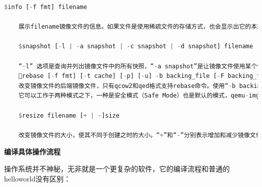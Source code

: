 \begin{lstlisting}[language={Rust}, label={code:forktest},
	caption={forktest.rs}]
	$info [-f fmt] filename
	
	展示filename镜像文件的信息。如果文件是使用稀疏文件的存储方式，也会显示出它的本来分配的大小以及实际已占用的磁盘空间大小。如果文件中存放有客户机快照，快照的信息也会被显示出来。
	
	$snapshot [-l | -a snapshot | -c snapshot | -d snapshot] filename
	
	“-l” 选项是查询并列出镜像文件中的所有快照，“-a snapshot”是让镜像文件使用某个快照，“-c snapshot”是创建一个快照，“-d”是删除一个快照。
	rebase [-f fmt] [-t cache] [-p] [-u] -b backing_file [-F backing_fmt] filename
	改变镜像文件的后端镜像文件，只有qcow2和qed格式支持rebase命令。使用“-b backing_file”中指定的文件作为后端镜像，后端镜像也被转化为“-F backing_fmt”中指定的后端镜像格式。
	它可以工作于两种模式之下，一种是安全模式（Safe Mode）也是默认的模式，qemu-img会去比较原来的后端镜像与现在的后端镜像的不同进行合理的处理；另一种是非安全模式（Unsafe Mode），是通过“-u”参数来指定的，这种模式主要用于将后端镜像进行了重命名或者移动了位置之后对前端镜像文件的修复处理，由用户去保证后端镜像的一致性。
	
	$resize filename [+ | -]size
	
	改变镜像文件的大小，使其不同于创建之时的大小。“+”和“-”分别表示增加和减少镜像文件的大小，而size也是支持K、M、G、T等单位的使用。缩小镜像的大小之前，需要在客户机中保证里面的文件系统有空余空间，否则会数据丢失，另外，qcow2格式文件不支持缩小镜像的操作。在增加了镜像文件大小后，也需启动客户机到里面去应用“fdisk”、“parted”等分区工具进行相应的操作才能真正让客户机使用到增加后的镜像空间。不过使用resize命令时需要小心（最好做好备份），如果失败的话，可能会导致镜像文件无法正常使用而造成数据丢失。
\end{lstlisting}

\textbf{编译具体操作流程}

操作系统并不神秘，无非就是一个更复杂的软件，它的编译流程和普通的helloworld没有区别：

